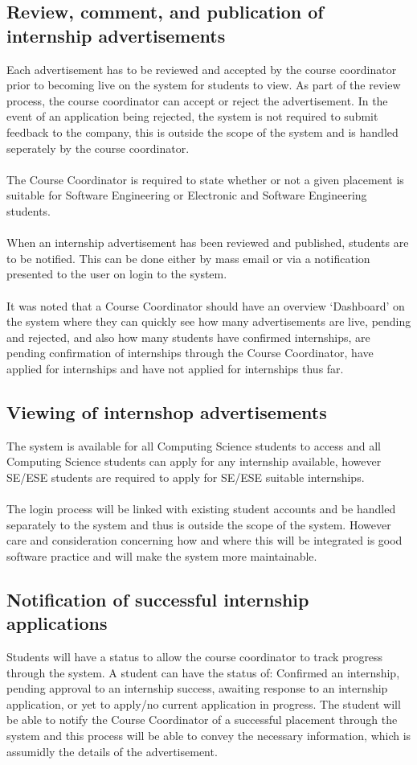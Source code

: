 \documentclass{l3deliverable}
\begin{document}
\subsection{Review, comment, and publication of internship advertisements}
Each advertisement has to be reviewed and accepted by the course coordinator
prior to becoming live on the system for students to view. As part of the review process, the
course coordinator can accept or reject the advertisement. In the event of an application being rejected, the system is not required to submit feedback to the company, this is outside the scope of the system and is handled seperately
by the course coordinator.
\\ \\
The Course Coordinator is required to state whether or not a given placement is suitable for Software Engineering or Electronic and Software Engineering students.
\\ \\
When an internship advertisement has been reviewed and published, students 
are to be notified. This can be done either by mass email or via a 
notification presented to the user on login to the system.
\\ \\
It was noted that a Course Coordinator should have an overview `Dashboard' on the system where they can quickly see how many advertisements are live, pending and rejected, and also how many students have confirmed internships, are pending confirmation of internships through the Course Coordinator, have applied for internships and have not applied for internships thus far.

\subsection{Viewing of internshop advertisements}
The system is available for all Computing Science students to access and 
all Computing Science students can apply for any internship available, however SE/ESE students
are required to apply for SE/ESE suitable internships.
\\ \\
The login process will be linked with existing student accounts and be
handled separately to the system and thus is outside the scope of the system. However care and consideration concerning how and where this will be integrated is good software practice and will make the system more maintainable.

\subsection{Notification of successful internship applications}
Students will have a status to allow the course coordinator to track progress
through the system. A student can have the status of: Confirmed an internship, pending
approval to an internship success, awaiting response to an internship application, or yet to apply/no current 
application in progress. The student will be able to notify the Course Coordinator of a successful placement through the system and this process will be able to convey the necessary information, which is assumidly the details of the advertisement.
\end{document}
